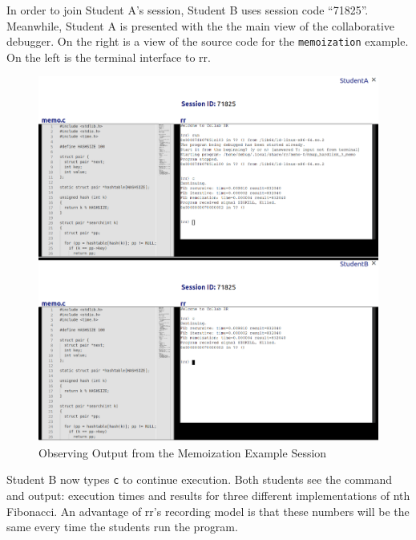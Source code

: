 \documentclass[12pt]{article}
\begin{document}
In order to join Student A's session, Student B uses session code
``71825''.  Meanwhile, Student A is presented with the the main view
of the collaborative debugger.  On the right is a view of the source
code for the \lstinline{memoization} example.  On the left is the
terminal interface to rr.\pagebreak

\begin{figure}[h!]

  \includegraphics[width=\textwidth]{session3i}
  \centering
  \caption{Observing Output from the Memoization Example Session}
  \label{session3i}
\end{figure}

Student B now types \lstinline{c} to continue execution.  Both
students see the command and output: execution times and results for
three different implementations of nth Fibonacci.  An advantage of
rr's recording model is that these numbers will be the same every time
the students run the program.\pagebreak
\end{document}
